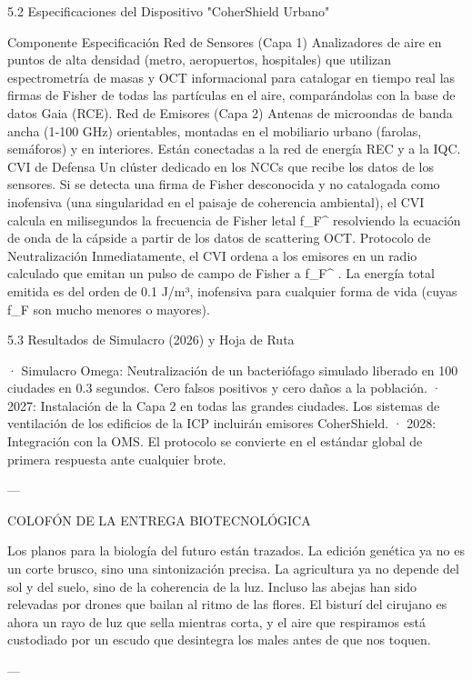 \documentclass[12pt,twoside]{book}
\begin{document}
5.2 Especificaciones del Dispositivo "CoherShield Urbano"

Componente Especificación
Red de Sensores (Capa 1) Analizadores de aire en puntos de alta densidad (metro, aeropuertos, hospitales) que utilizan espectrometría de masas y OCT informacional para catalogar en tiempo real las firmas de Fisher de todas las partículas en el aire, comparándolas con la base de datos Gaia (RCE).
Red de Emisores (Capa 2) Antenas de microondas de banda ancha (1‑100 GHz) orientables, montadas en el mobiliario urbano (farolas, semáforos) y en interiores. Están conectadas a la red de energía REC y a la IQC.
CVI de Defensa Un clúster dedicado en los NCCs que recibe los datos de los sensores. Si se detecta una firma de Fisher desconocida y no catalogada como inofensiva (una singularidad en el paisaje de coherencia ambiental), el CVI calcula en milisegundos la frecuencia de Fisher letal  f_F^{}  resolviendo la ecuación de onda de la cápside a partir de los datos de scattering OCT.
Protocolo de Neutralización Inmediatamente, el CVI ordena a los emisores en un radio calculado que emitan un pulso de campo de Fisher a  f_F^{} . La energía total emitida es del orden de 0.1 J/m³, inofensiva para cualquier forma de vida (cuyas  f_F  son mucho menores o mayores).

5.3 Resultados de Simulacro (2026) y Hoja de Ruta

· Simulacro Omega: Neutralización de un bacteriófago simulado liberado en 100 ciudades en 0.3 segundos. Cero falsos positivos y cero daños a la población.
· 2027: Instalación de la Capa 2 en todas las grandes ciudades. Los sistemas de ventilación de los edificios de la ICP incluirán emisores CoherShield.
· 2028: Integración con la OMS. El protocolo se convierte en el estándar global de primera respuesta ante cualquier brote.

---

COLOFÓN DE LA ENTREGA BIOTECNOLÓGICA

Los planos para la biología del futuro están trazados. La edición genética ya no es un corte brusco, sino una sintonización precisa. La agricultura ya no depende del sol y del suelo, sino de la coherencia de la luz. Incluso las abejas han sido relevadas por drones que bailan al ritmo de las flores. El bisturí del cirujano es ahora un rayo de luz que sella mientras corta, y el aire que respiramos está custodiado por un escudo que desintegra los males antes de que nos toquen.


---
\end{document}
